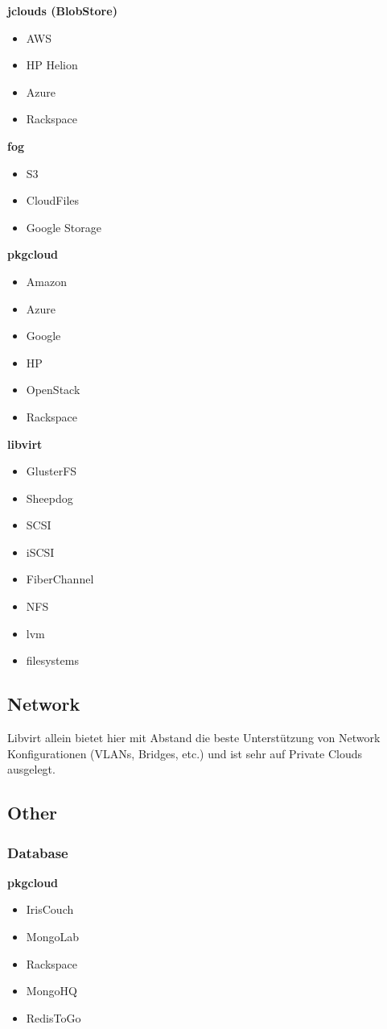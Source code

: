 \textbf{jclouds (BlobStore)}
\begin{itemize}
\item AWS
\item HP Helion
\item Azure
\item Rackspace
\end{itemize}

\textbf{fog}
\begin{itemize}
\item S3
\item CloudFiles
\item Google Storage
\end{itemize}

\textbf{pkgcloud}
\begin{itemize}
\item Amazon
\item Azure
\item Google
\item HP
\item OpenStack
\item Rackspace
\end{itemize}

\textbf{libvirt}
\begin{itemize}
  \item GlusterFS
  \item Sheepdog
  \item SCSI
  \item iSCSI
  \item FiberChannel
  \item NFS
  \item lvm
  \item filesystems
\end{itemize}

\subsection{Network}
Libvirt allein bietet hier mit Abstand die beste Unterstützung von Network Konfigurationen 
(VLANs, Bridges, etc.) und ist sehr auf Private Clouds ausgelegt.\\


\subsection{Other}
\subsubsection{Database}
\textbf{pkgcloud}
\begin{itemize}
\item IrisCouch
\item MongoLab
\item Rackspace
\item MongoHQ
\item RedisToGo
\end{itemize}

